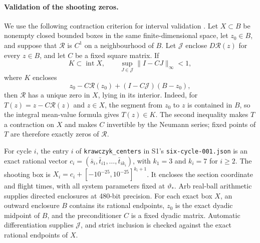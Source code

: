 \documentclass[11pt]{article}
\theoremstyle{remark}
\newcommand{\interior}{\operatorname{int}}
\begin{document}
\paragraph{Validation of the shooting zeros.}
We use the following contraction criterion for interval validation
\cite[Section 13]{rump}.  Let \(X\subset B\)
be nonempty closed bounded boxes in the same finite-dimensional space,
let \(z_0\in B\), and suppose that \(\mathcal R\) is \(C^1\) on a
neighbourhood of \(B\).  Let \(\mathcal J\) enclose
\(D\mathcal R(z)\) for every \(z\in B\), and let \(C\) be a fixed square
matrix.  If
\begin{equation}\label{eq:validation}
 K\subset\interior X,\qquad
 \sup_{J\in\mathcal J}\|I-CJ\|_\infty<1,
\end{equation}
where \(K\) encloses
\[
 z_0-C\mathcal R(z_0)+(I-C\mathcal J)(B-z_0),
\]
then \(\mathcal R\) has a unique zero in \(X\), lying in its interior.
Indeed, for \(T(z)=z-C\mathcal R(z)\) and \(z\in X\), the segment from
\(z_0\) to \(z\) is contained in \(B\), so the integral mean-value
formula gives \(T(z)\in K\).  The second inequality makes \(T\) a
contraction on \(X\) and makes \(C\) invertible by the Neumann series;
fixed points of \(T\) are therefore exactly zeros of \(\mathcal R\).

For cycle \(i\), the entry \(i\) of \texttt{krawczyk\_centers} in
S1's \texttt{six-cycle-001.json} is an exact rational vector
\(c_i=(\bar s_i,\bar t_{i1},\ldots,\bar t_{ik_i})\), with \(k_1=3\) and
\(k_i=7\) for \(i\ge2\).  The shooting box is
\(X_i=c_i+[-10^{-25},10^{-25}]^{k_i+1}\).  It encloses the section
coordinate and flight times, with all system parameters fixed at
\(\vartheta_*\).
Arb real-ball arithmetic \cite{arb} supplies directed enclosures at
480-bit precision.  For each exact box \(X\), an outward enclosure \(B\)
contains its rational endpoints, \(z_0\) is the exact dyadic midpoint
of \(B\), and the preconditioner \(C\) is a fixed dyadic matrix.
Automatic differentiation supplies \(\mathcal J\), and strict inclusion
is checked against the exact rational endpoints of \(X\).
\end{document}
